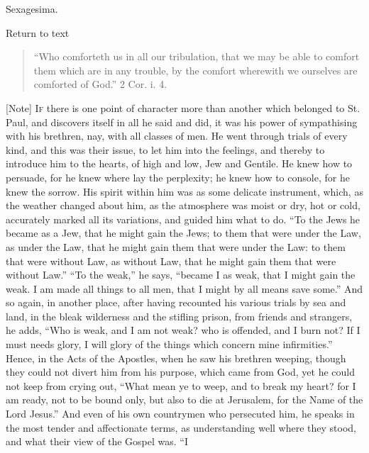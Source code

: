 
Sexagesima.

Return to text


\begin{quote}

``Who comforteth us in all our tribulation, that we may be
able to comfort them which are in any trouble, by the comfort
wherewith we ourselves are comforted of God.'' 2 Cor. i. 4.

\end{quote}

[Note] I\textsc{f} there is one point of
character more than another which belonged to St. Paul, and discovers
itself in all he said and did, it was his power of sympathising with
his brethren, nay, with all classes of men. He went through trials of
every kind, and this was their issue, to let him into the feelings,
and thereby to introduce him to the hearts, of high and low, Jew and
Gentile. He knew how to persuade, for he knew where lay the
perplexity; he knew how to console, for he knew the sorrow. His spirit
within him was as some delicate instrument, which, as the weather
changed about him, as the atmosphere was moist or dry, hot or cold,
accurately marked all its variations, and guided him what to do.
``To the Jews he became as a Jew, that he might gain the Jews; to
them that were under the Law, as under the Law, that he might gain
them that were under the Law: to them that were without Law, as
without Law, that he might gain them that were without Law.''
``To the weak,'' he says, ``became I as weak, that I might
gain the weak. I am made all things to all men, that I might by all
means save some.'' And so again, in another place, after having
recounted his various trials by sea and land, in the bleak wilderness
and the stifling prison, from friends and strangers, he adds,
``Who is weak, and I am not weak? who is offended, and I burn not?
If I must needs glory, I will glory of the things which concern mine
infirmities.'' Hence, in the Acts of the Apostles, when he saw his
brethren weeping, though they could not divert him from his purpose,
which came from God, yet he could not keep from crying out, ``What
mean ye to weep, and to break my heart? for I am ready, not to be
bound only, but also to die at Jerusalem, for the Name of the Lord
Jesus.'' And even of his own countrymen who persecuted him, he
speaks in the most tender and affectionate terms, as understanding
well where they stood, and what their view of the Gospel was. ``I
